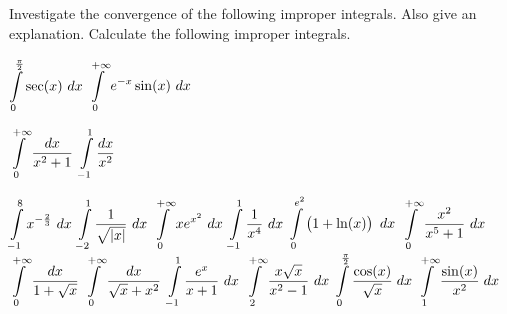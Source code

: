 \subsection*{}
\begin{Exercise} 
\ifanalysis Investigate the convergence of the following improper integrals. Also give an explanation. \fi 
\ifcalculus Calculate the following improper integrals. \fi
    \begin{multicols}{2} 
		\Question[difficulty = 1] $\displaystyle \int\limits_0^{\frac{\pi}{2}} \sec (x)\ dx$
		\Question[difficulty = 1] $\displaystyle \int\limits_0^{+\infty}  e^{-x} \sin (x)\ dx$
		
		\ifcalculus
		\Question[difficulty = 1] $\displaystyle \int\limits_0^{+\infty} \dfrac{dx}{x^2+1}$ %
		\Question[difficulty = 1] $\displaystyle \int\limits_{-1}^{1} \dfrac{dx}{x^2}$ %
		\fi
		
		\Question[difficulty = 1] $\displaystyle \int\limits_{-1}^{8}  x^{-\frac{2}{3}}\ dx$
		\Question[difficulty = 1] $\ds \int\limits_{-2}^{1}  \dfrac{1}{\sqrt{|x|}}\ dx$
		\Question[difficulty = 1] $\displaystyle \int\limits_{0}^{+\infty}  x e^{x^2}\ dx$
		\Question[difficulty = 2] $\displaystyle \int\limits_{-1}^{1}  \dfrac{1}{x^4}\ dx$
		\Question[difficulty = 1] $\displaystyle \int\limits_{0}^{e^2}  \left( 1 + \ln(x) \right) \ dx$
		\ifanalysis
		\Question[difficulty = 2] $\displaystyle \int\limits_0^{+\infty} \dfrac{x^2}{x^5+1} \ dx$
		\Question[difficulty = 2] $\displaystyle \int\limits_0^{+\infty}  \dfrac{dx}{1+\sqrt{x}}$
		\Question[difficulty = 2] $\displaystyle \int\limits_0^{+\infty}  \dfrac{dx}{\sqrt{x}+x^2}$
		\Question[difficulty = 2] $\ds \int\limits_{-1}^{1} \dfrac{e^x}{x+1} \ dx$  
		\Question[difficulty = 2] $\displaystyle \int\limits_2^{+\infty}  \dfrac{x\sqrt{x}}{x^2-1}\ dx$
		\Question[difficulty = 2] $\displaystyle \int\limits_0^{\frac{\pi}{2}} \dfrac{\cos (x)}{\sqrt{x}} \; dx$
		\Question[difficulty = 2] $\displaystyle \int\limits_1^{+\infty} \dfrac{\sin (x)}{x^2} \; dx $
	    \fi
	    \EndCurrentQuestion
	 \end{multicols} 
\end{Exercise}

